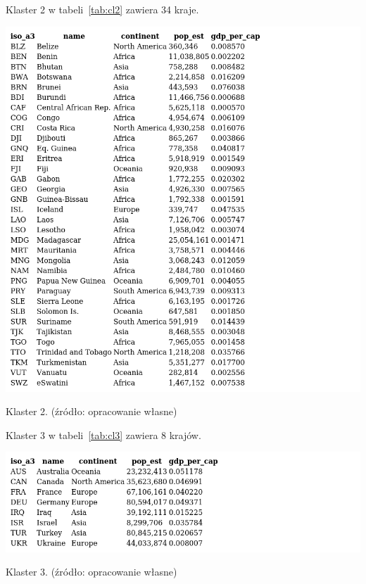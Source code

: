 \documentclass[11pt]{report}
\begin{document}
    Klaster 2 w tabeli~\ref{tab:cl2} zawiera 34 kraje.
    \begin{table}[!htp]
        \centering
        \includegraphics[width=\linewidth]{tables/CLUST/clust2kmeans.png}
        \caption{Klaster 2. (źródło: opracowanie własne)}
        \label{tab:cl2}
    \end{table}

    Klaster 3 w tabeli~\ref{tab:cl3} zawiera 8 krajów.
    \begin{table}[!htp]
        \centering
        \includegraphics[width=\linewidth]{tables/CLUST/clust3kmeans.png}
        \caption{Klaster 3. (źródło: opracowanie własne)}
        \label{tab:cl3}
    \end{table}
\end{document}

